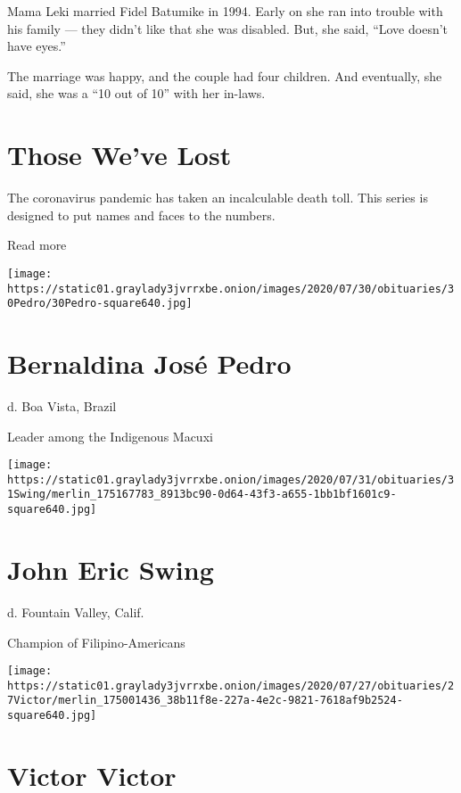 Mama Leki married Fidel Batumike in 1994. Early on she ran into trouble
with his family --- they didn't like that she was disabled. But, she
said, ``Love doesn't have eyes.''

The marriage was happy, and the couple had four children. And
eventually, she said, she was a ``10 out of 10'' with her in-laws.

\href{https://www.nytimes3xbfgragh.onion/interactive/2020/obituaries/people-died-coronavirus-obituaries.html?action=click\&pgtype=Article\&state=default\&region=BELOW_MAIN_CONTENT\&context=covid_obits_promo}{}

\hypertarget{those-weve-lost}{%
\section{Those We've Lost}\label{those-weve-lost}}

The coronavirus pandemic has taken an incalculable death toll. This
series is designed to put names and faces to the numbers.

Read more

\texttt{[image: https://static01.graylady3jvrrxbe.onion/images/2020/07/30/obituaries/30Pedro/30Pedro-square640.jpg]}

\hypertarget{bernaldina-josuxe9-pedro}{%
\section{Bernaldina José Pedro}\label{bernaldina-josuxe9-pedro}}

d. Boa Vista, Brazil

Leader among the Indigenous Macuxi

\texttt{[image: https://static01.graylady3jvrrxbe.onion/images/2020/07/31/obituaries/31Swing/merlin\_175167783\_8913bc90-0d64-43f3-a655-1bb1bf1601c9-square640.jpg]}

\hypertarget{john-eric-swing}{%
\section{John Eric Swing}\label{john-eric-swing}}

d. Fountain Valley, Calif.

Champion of Filipino-Americans

\texttt{[image: https://static01.graylady3jvrrxbe.onion/images/2020/07/27/obituaries/27Victor/merlin\_175001436\_38b11f8e-227a-4e2c-9821-7618af9b2524-square640.jpg]}

\hypertarget{victor-victor}{%
\section{Victor Victor}\label{victor-victor}}

